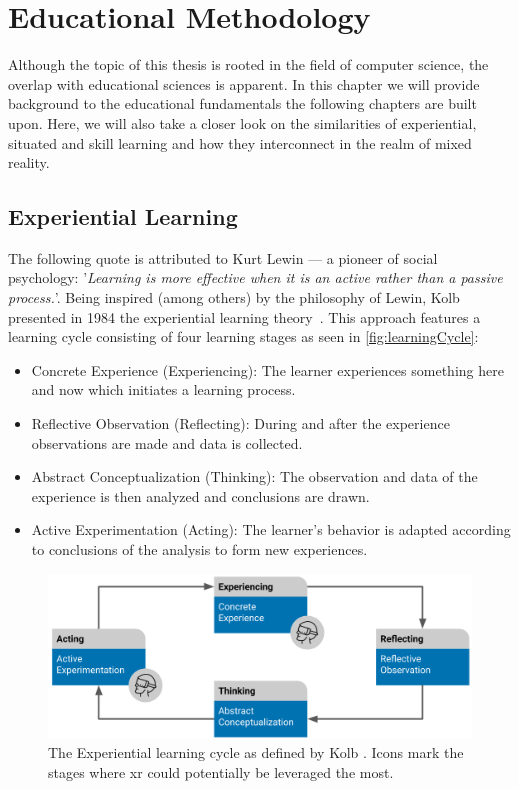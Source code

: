 %
\chapter{Educational Methodology \label{chap:concepts}}
Although the topic of this thesis is rooted in the field of computer science, the overlap with educational sciences is apparent. In this chapter we will provide background to the educational fundamentals the following chapters are built upon. Here, we will also take a closer look on the similarities of experiential, situated and skill learning and how they interconnect in the realm of mixed reality.


\section{Experiential Learning \label{sec:experiential}}
The following quote is attributed to Kurt Lewin --- a pioneer of social psychology: '\emph{Learning is more effective when it is an active rather than a passive process.}'. Being inspired (among others) by the philosophy of Lewin, Kolb presented in 1984 the experiential learning theory~\cite{kolb:1984:experiential}.
This approach features a learning cycle consisting of four learning stages as seen in \autoref{fig:learningCycle}:

\begin{itemize}
    \setlength{\itemsep}{-0.3cm}
    \item Concrete Experience (Experiencing): The learner experiences something here and now which initiates a learning process.
    \item Reflective Observation (Reflecting): During and after the experience observations are made and data is collected.
    \item Abstract Conceptualization (Thinking): The observation and data of the experience is then analyzed and conclusions are drawn.
    \item Active Experimentation (Acting): The learner's behavior is adapted according to conclusions of the analysis to form new experiences. 
\end{itemize}

\begin{figure}[h!bt]
	\centering
	\includegraphics[width=0.9\linewidth]{pictures/ExperientialLearningCycle2.png}
	\captionsetup{labelfont=bf,textfont=it}
	\caption[The Experiential learning cycle as defined by Kolb \cite{kolb:1984:experiential}.]{The Experiential learning cycle as defined by Kolb \cite{kolb:1984:experiential}. Icons mark the stages where \acrshort{xr} could potentially be leveraged the most.\label{fig:learningCycle}}
\end{figure}

